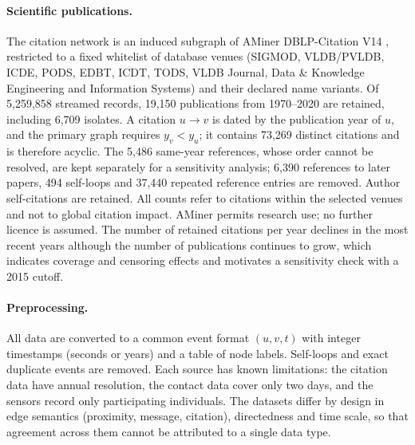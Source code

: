 \paragraph{Scientific publications.}
The citation network is an induced subgraph of AMiner DBLP-Citation V14
\citep{tang2008arnetminer}, restricted to a fixed whitelist of database venues (SIGMOD,
VLDB/PVLDB, ICDE, PODS, EDBT, ICDT, TODS, VLDB Journal, Data \& Knowledge Engineering and
Information Systems) and their declared name variants. Of 5,259,858 streamed records,
19,150 publications from 1970--2020 are retained, including 6,709 isolates. A citation
$u\to v$ is dated by the publication year of $u$, and the primary graph requires
$y_v<y_u$; it contains 73,269 distinct citations and is therefore acyclic. The 5,486
same-year references, whose order cannot be resolved, are kept separately for a
sensitivity analysis; 6,390 references to later papers, 494 self-loops and 37,440
repeated reference entries are removed. Author self-citations are retained. All counts
refer to citations within the selected venues and not to global citation impact. AMiner
permits research use; no further licence is assumed. The number of retained citations per
year declines in the most recent years although the number of publications continues to
grow, which indicates coverage and censoring effects and motivates a sensitivity check
with a 2015 cutoff.

\paragraph{Preprocessing.}
All data are converted to a common event format $(u,v,t)$ with integer timestamps
(seconds or years) and a table of node labels. Self-loops and exact duplicate events are
removed. Each source has known limitations: the citation data have annual resolution,
the contact data cover only two days, and the sensors record only participating
individuals. The datasets differ by design in edge semantics (proximity, message,
citation), directedness and time scale, so that agreement across them cannot be
attributed to a single data type.

